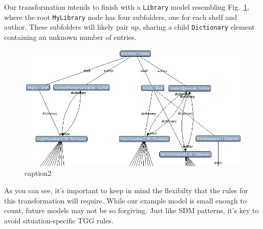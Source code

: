 \newpage

Our transformation intends to finish with a \texttt{Library} model resembling Fig.~\ref{eclipse:dictionaryStart}, where the root \texttt{MyLibrary} node has
four subfolders, one for each shelf and author. These subfolders will likely pair up, sharing a child \texttt{Dictionary} element containing an unknown number
of entries.

\vspace{1cm}

\begin{figure}[htbp]
\hspace{-1.5cm}
    \includegraphics[width=1.2\textwidth]{eclipse_DictionaryResultMetamodel}
 	\caption{caption2}
 	\label{eclipse:dictionaryStart}
\end{figure}

\vspace{1cm}

As you can see, it's important to keep in mind the flexibilty that the rules for this transformation will require. While our example model is small
enough to count, future models may not be so forgiving. Just like SDM patterns, it's key to avoid situation-specific TGG rules.








